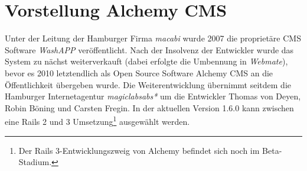 \newpage
\section{Vorstellung Alchemy CMS}
Unter der Leitung der Hamburger Firma \emph{macabi} wurde 2007 die proprietäre CMS Software \emph{WashAPP} veröffentlicht. Nach der Insolvenz der Entwickler wurde das System zu nächst weiterverkauft (dabei erfolgte die Umbennung in \emph{Webmate}), bevor es 2010 letztendlich als Open Source Software Alchemy CMS an die Öffentlichkeit übergeben wurde. Die Weiterentwicklung übernimmt seitdem die Hamburger Internetagentur \emph{magiclabsabs*} um die Entwickler Thomas von Deyen, Robin Böning und Carsten Fregin.
\newline
In der aktuellen Version 1.6.0 kann zwischen eine Rails 2 und 3 Umsetzung\footnote{Der Rails 3-Entwicklungszweig von Alchemy befindet sich noch im Beta-Stadium.} ausgewählt werden.

